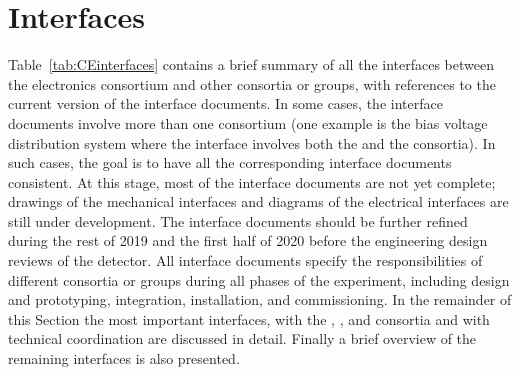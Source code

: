 \section{Interfaces}
\label{sec:fdsp-tpcelec-interfaces}

Table~\ref{tab:CEinterfaces} contains a brief summary of all the interfaces
between the  electronics consortium and other consortia or groups,
with references to the current version of the interface documents. 
In some cases, the interface documents involve more than one 
consortium (one example is the bias voltage distribution system where
the interface involves both the  and the  consortia).
In such cases, the goal is to have all the corresponding interface documents 
consistent. At this stage, most of the interface documents are
not yet complete; drawings of the mechanical interfaces and diagrams
of the electrical interfaces are still under development. The interface 
documents should be further refined during the rest of 2019 and the 
first half of 2020 before the engineering design
reviews of the detector. All interface documents specify the responsibilities
of different consortia or groups during all phases of the experiment,
including design and prototyping, integration, installation,
and commissioning. In the remainder of this Section the most
important interfaces, with the , , and 
consortia and with technical coordination are discussed in detail.
Finally a brief overview of the remaining interfaces is also presented.

